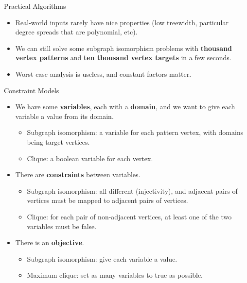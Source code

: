 \documentclass{beamer}
\begin{document}
\begin{frame}{Practical Algorithms}
    \begin{itemize}
        \item Real-world inputs rarely have nice properties (low treewidth, particular degree
            spreads that are polynomial, etc).

        \item We can still solve some subgraph isomorphism problems with \textbf{thousand vertex
            patterns} and \textbf{ten thousand vertex targets} in a few seconds.

        \item Worst-case analysis is useless, and constant factors matter.
    \end{itemize}
\end{frame}

\begin{frame}{Constraint Models}
    \begin{itemize}
        \item We have some \textbf{variables}, each with a \textbf{domain}, and we want to give each
            variable a value from its domain.
            \begin{itemize}
                \item Subgraph isomorphism: a variable for each pattern vertex, with domains being
                    target vertices.
                \item Clique: a boolean variable for each vertex.
            \end{itemize}
        \item There are \textbf{constraints} between variables.
            \begin{itemize}
                \item Subgraph isomorphism: all-different (injectivity), and adjacent pairs of
                    vertices must be mapped to adjacent pairs of vertices.
                \item Clique: for each pair of non-adjacent vertices, at least one of the two
                    variables must be false.
            \end{itemize}
        \item There is an \textbf{objective}.
            \begin{itemize}
                \item Subgraph isomorphism: give each variable a value.
                \item Maximum clique: set as many variables to true as possible.
            \end{itemize}
    \end{itemize}
\end{frame}
\end{document}
